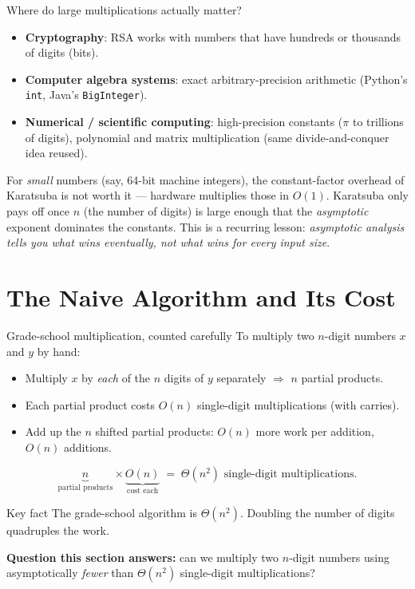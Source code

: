 \documentclass[11pt,aspectratio=169]{beamer}
\begin{document}
\begin{frame}{Where do large multiplications actually matter?}
  \begin{itemize}
    \item \textbf{Cryptography}: RSA works with numbers that have hundreds or thousands of
    digits (bits).
    \item \textbf{Computer algebra systems}: exact arbitrary-precision arithmetic
    (Python's \texttt{int}, Java's \texttt{BigInteger}).
    \item \textbf{Numerical / scientific computing}: high-precision constants ($\pi$ to
    trillions of digits), polynomial and matrix multiplication (same divide-and-conquer
    idea reused).
  \end{itemize}
  \vspace{1em}
  For \emph{small} numbers (say, 64-bit machine integers), the constant-factor overhead of
  Karatsuba is not worth it --- hardware multiplies those in $O(1)$. Karatsuba only pays off
  once $n$ (the number of digits) is large enough that the \emph{asymptotic} exponent
  dominates the constants. This is a recurring lesson: \emph{asymptotic analysis tells you
  what wins eventually, not what wins for every input size}.
\end{frame}

\section{The Naive Algorithm and Its Cost}

\begin{frame}{Grade-school multiplication, counted carefully}
  To multiply two $n$-digit numbers $x$ and $y$ by hand:
  \begin{itemize}
    \item Multiply $x$ by \emph{each} of the $n$ digits of $y$ separately $\Rightarrow$
    $n$ partial products.
    \item Each partial product costs $O(n)$ single-digit multiplications (with carries).
    \item Add up the $n$ shifted partial products: $O(n)$ more work per addition, $O(n)$
    additions.
  \end{itemize}
  \[
    \underbrace{n}_{\text{partial products}} \times \underbrace{O(n)}_{\text{cost each}}
    \;=\; \Theta(n^2) \text{ single-digit multiplications.}
  \]
  \begin{exampleblock}{Key fact}
    The grade-school algorithm is $\boxed{\Theta(n^2)}$. Doubling the number of digits
    quadruples the work.
  \end{exampleblock}
  \textbf{Question this section answers:} can we multiply two $n$-digit numbers using
  asymptotically \emph{fewer} than $\Theta(n^2)$ single-digit multiplications?
\end{frame}
\end{document}
